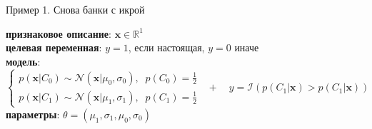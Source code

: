 \documentclass[aspectratio=169]{beamer}
\begin{document}
\begin{frame}{Пример 1. Снова банки с икрой}
    
{\bf признаковое описание}: $\mathbf{x} \in \mathbb{R}^1$ \\
\vspace{1em}
{\bf целевая переменная}: $y = 1$, если настоящая, $y = 0$ иначе \\
\vspace{1em}
{\bf модель}:
\[
\begin{cases}
p(\mathbf{x} | C_0) \sim \mathcal{N}(\mathbf{x} | \mu_0, \sigma_0), \;\; p(C_0) = \frac 1 2 \\
p(\mathbf{x} | C_1) \sim \mathcal{N}(\mathbf{x} | \mu_1, \sigma_1), \;\; p(C_1) = \frac 1 2
\end{cases} \;\; + \quad y = \mathcal{I}(p(C_1 | \mathbf{x}) > p(C_1 | \mathbf{x}))
\]
\vspace{1em}
{\bf параметры}: $\theta = (\mu_1, \sigma_1, \mu_0, \sigma_0)$

\end{frame}
\end{document}
